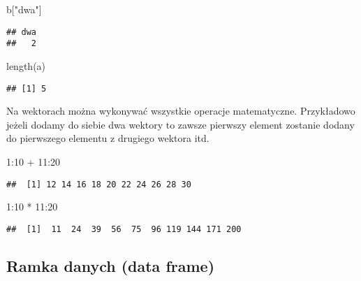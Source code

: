 \documentclass[
]{book}
\newenvironment{Shaded}{\begin{snugshade}}{\end{snugshade}}
\newcommand{\DecValTok}[1]{\textcolor[rgb]{0.00,0.00,0.81}{#1}}
\newcommand{\FunctionTok}[1]{\textcolor[rgb]{0.00,0.00,0.00}{#1}}
\newcommand{\NormalTok}[1]{#1}
\newcommand{\SpecialCharTok}[1]{\textcolor[rgb]{0.00,0.00,0.00}{#1}}
\newcommand{\StringTok}[1]{\textcolor[rgb]{0.31,0.60,0.02}{#1}}
\begin{document}
\begin{Shaded}
\begin{Highlighting}[]
\NormalTok{b[}\StringTok{"dwa"}\NormalTok{]}
\end{Highlighting}
\end{Shaded}

\begin{verbatim}
## dwa 
##   2
\end{verbatim}

\begin{Shaded}
\begin{Highlighting}[]
\FunctionTok{length}\NormalTok{(a)}
\end{Highlighting}
\end{Shaded}

\begin{verbatim}
## [1] 5
\end{verbatim}

Na wektorach można wykonywać wszystkie operacje matematyczne. Przykładowo jeżeli dodamy do siebie dwa wektory to zawsze pierwszy element zostanie dodany do pierwszego elementu z drugiego wektora itd.

\begin{Shaded}
\begin{Highlighting}[]
\DecValTok{1}\SpecialCharTok{:}\DecValTok{10} \SpecialCharTok{+} \DecValTok{11}\SpecialCharTok{:}\DecValTok{20}
\end{Highlighting}
\end{Shaded}

\begin{verbatim}
##  [1] 12 14 16 18 20 22 24 26 28 30
\end{verbatim}

\begin{Shaded}
\begin{Highlighting}[]
\DecValTok{1}\SpecialCharTok{:}\DecValTok{10} \SpecialCharTok{*} \DecValTok{11}\SpecialCharTok{:}\DecValTok{20}
\end{Highlighting}
\end{Shaded}

\begin{verbatim}
##  [1]  11  24  39  56  75  96 119 144 171 200
\end{verbatim}

\hypertarget{ramka-danych-data-frame}{%
\subsection{Ramka danych (data frame)}\label{ramka-danych-data-frame}}
\end{document}
